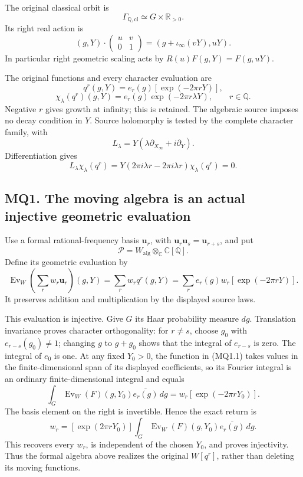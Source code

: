 The original classical orbit is \[
\Gamma_{\mathbb Q,\mathrm{cl}}\simeq G\times\mathbb R_{>0}.
\] Its right real action is \[
(g,Y)\cdot
\begin{pmatrix}u&v\\0&1\end{pmatrix}
=(g+\iota_\infty(vY),uY).
\tag{MQ0.3}
\] In particular right geometric scaling acts by \(R(u)F(g,Y)=F(g,uY)\).

The original functions and every character evaluation are \[
q^r(g,Y)=e_r(g)[\exp(-2\pi rY)],
\] \[
\chi_\lambda(q^r)(g,Y)
=e_r(g)\exp(-2\pi r\lambda Y),\qquad r\in\mathbb Q.
\tag{MQ0.4}
\] Negative \(r\) gives growth at infinity; this is retained. The
algebraic source imposes no decay condition in \(Y\). Source holomorphy
is tested by the complete character family, with \[
L_\lambda=Y(\lambda\partial_{X_\infty}+i\partial_Y).
\] Differentiation gives \[
L_\lambda\chi_\lambda(q^r)
=Y(2\pi i\lambda r-2\pi i\lambda r)\chi_\lambda(q^r)=0.
\tag{MQ0.5}
\]

\subsection{MQ1. The moving algebra is an actual injective geometric
evaluation}\label{mq1.-the-moving-algebra-is-an-actual-injective-geometric-evaluation}

Use a formal rational-frequency basis \(\mathbf u_r\), with
\(\mathbf u_r\mathbf u_s=\mathbf u_{r+s}\), and put \[
\mathcal P=W_{\mathrm{alg}}\otimes_{\mathbb C}\mathbb C[\mathbb Q].
\] Define its geometric evaluation by \[
\operatorname{Ev}_W\left(\sum_r w_r\mathbf u_r\right)(g,Y)
=\sum_r w_rq^r(g,Y)
=\sum_r e_r(g)w_r[\exp(-2\pi rY)].
\tag{MQ1.1}
\] It preserves addition and multiplication by the displayed source
laws.

This evaluation is injective. Give \(G\) its Haar probability measure
\(dg\). Translation invariance proves character orthogonality: for
\(r\ne s\), choose \(g_0\) with \(e_{r-s}(g_0)\ne1\); changing \(g\) to
\(g+g_0\) shows that the integral of \(e_{r-s}\) is zero. The integral
of \(e_0\) is one. At any fixed \(Y_0>0\), the function in (MQ1.1) takes
values in the finite-dimensional span of its displayed coefficients, so
its Fourier integral is an ordinary finite-dimensional integral and
equals \[
\int_G \operatorname{Ev}_W(F)(g,Y_0)\overline{e_r(g)}\,dg
=w_r[\exp(-2\pi rY_0)].
\] The basis element on the right is invertible. Hence the exact return
is \[
\boxed{
w_r=[\exp(2\pi rY_0)]
\int_G \operatorname{Ev}_W(F)(g,Y_0)\overline{e_r(g)}\,dg.}
\tag{MQ1.2}
\] This recovers every \(w_r\), is independent of the chosen \(Y_0\),
and proves injectivity. Thus the formal algebra above realizes the
original \(W[q^r]\), rather than deleting its moving functions.

